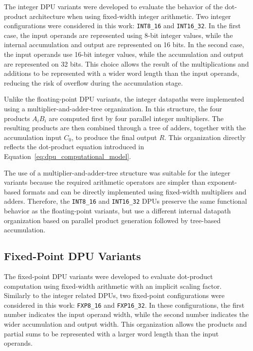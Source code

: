 The integer DPU variants were developed to evaluate the behavior of the dot-product architecture when using fixed-width integer arithmetic. Two integer configurations were considered in this work: \texttt{INT8\_16} and \texttt{INT16\_32}. In the first case, the input operands are represented using 8-bit integer values, while the internal accumulation and output are represented on 16 bits. In the second case, the input operands use 16-bit integer values, while the accumulation and output are represented on 32 bits. This choice allows the result of the multiplications and additions to be represented with a wider word length than the input operands, reducing the risk of overflow during the accumulation stage.

Unlike the floating-point DPU variants, the integer datapaths were implemented using a multiplier-and-adder-tree organization. In this structure, the four products $A_iB_i$ are computed first by four parallel integer multipliers. The resulting products are then combined through a tree of adders, together with the accumulation input $C_0$, to produce the final output $R$. This organization directly reflects the dot-product equation introduced in Equation~\eqref{eq:dpu_computational_model}.

The use of a multiplier-and-adder-tree structure was suitable for the integer variants because the required arithmetic operators are simpler than exponent-based formats and can be directly implemented using fixed-width multipliers and adders. Therefore, the \texttt{INT8\_16} and \texttt{INT16\_32} DPUs preserve the same functional behavior as the floating-point variants, but use a different internal datapath organization based on parallel product generation followed by tree-based accumulation.

\subsection{Fixed-Point DPU Variants}
The fixed-point DPU variants were developed to evaluate dot-product computation using fixed-width arithmetic with an implicit scaling factor. Similarly to the integer related DPUs, two fixed-point configurations were considered in this work: \texttt{FXP8\_16} and \texttt{FXP16\_32}. In these configurations, the first number indicates the input operand width, while the second number indicates the wider accumulation and output width. This organization allows the products and partial sums to be represented with a larger word length than the input operands.

